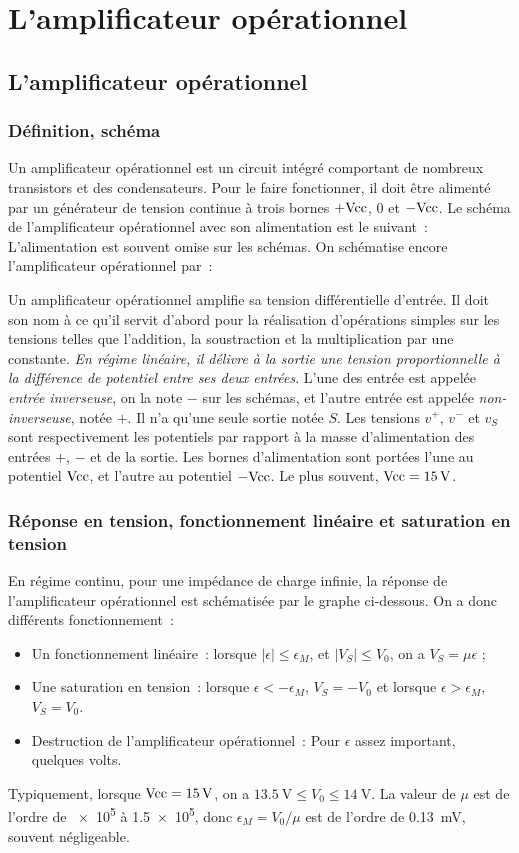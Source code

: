 \chapter{L'amplificateur opérationnel}
\minitoc
\minilof
\minilot
%
\section{L'amplificateur opérationnel}
\subsection{Définition, schéma}
Un amplificateur opérationnel est un circuit intégré comportant de nombreux transistors et des condensateurs. Pour le faire fonctionner, il doit être alimenté par un générateur de tension continue à trois bornes $+\textrm{Vcc}$, $0$ et $-\textrm{Vcc}$. Le schéma de l'amplificateur opérationnel avec son alimentation est le suivant~:
L'alimentation est souvent omise sur les schémas. On schématise encore l'amplificateur opérationnel par~:

Un amplificateur opérationnel amplifie sa tension différentielle d'entrée. Il doit son nom à ce qu'il servit d'abord pour la réalisation d'opérations simples sur les tensions telles que l'addition, la soustraction et la multiplication par une constante. \emph{En régime linéaire, il délivre à la sortie une tension proportionnelle à la différence de potentiel entre ses deux entrées}. L'une des entrée est appelée \emph{entrée inverseuse}, on la note $-$ sur les schémas, et l'autre entrée est appelée \emph{non-inverseuse}, notée $+$. Il n'a qu'une seule sortie notée $S$. Les tensions $v^+$, $v^-$ et $v_S$ sont respectivement les potentiels par rapport à la masse d'alimentation des entrées $+$, $-$ et de la sortie. Les bornes d'alimentation sont portées l'une au potentiel $\textrm{Vcc}$, et l'autre au potentiel $-\textrm{Vcc}$. Le plus souvent, $\textrm{Vcc} = \SI{15}{\volt}$.
\subsection{Réponse en tension, fonctionnement linéaire et saturation en tension}
En régime continu, pour une impédance de charge infinie, la réponse de l'amplificateur opérationnel est schématisée par le graphe ci-dessous.%
On a donc différents fonctionnement~:
\begin{itemize}
	\item Un fonctionnement linéaire~: lorsque $\mid \epsilon \mid \leq \epsilon_M$, et $\mid V_S \mid \leq V_0$, on a $V_S = \mu \epsilon$ ;
	\item Une saturation en tension~: lorsque $\epsilon < -\epsilon_M$, $V_S = -V_0$ et lorsque $\epsilon > \epsilon_M$, $V_S = V_0$.
	\item Destruction de l'amplificateur opérationnel~: Pour $\epsilon$ assez important, quelques volts.
\end{itemize}
Typiquement, lorsque $\textrm{Vcc} = \SI{15}{\volt}$, on a $\SI{13.5}{\volt} \leq V_0 \leq \SI{14}{\volt}$. La valeur de $\mu$ est de l'ordre de \num{e5} à \num{1.5e5}, donc $\epsilon_M = V_0/\mu$ est de l'ordre de \SI{0.13}{\milli\volt}, souvent négligeable.

